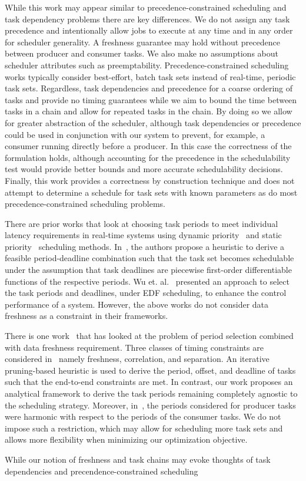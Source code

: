 While this work may appear similar to precedence-constrained scheduling and task dependency problems there are key differences. We do not assign any task precedence and intentionally allow jobs to execute at any time and in any order for scheduler generality. A freshness guarantee may hold without precedence between producer and consumer tasks. We also make no assumptions about scheduler attributes such as preemptability. Precedence-constrained scheduling works typically consider best-effort, batch task sets instead of real-time, periodic task sets. Regardless, task dependencies and precedence for a coarse ordering of tasks and provide no timing guarantees while we aim to bound the time between tasks in a chain and allow for repeated tasks in the chain. By doing so we allow for greater abstraction of the scheduler, although task dependencies or precedence could be used in conjunction with our system to prevent, for example, a consumer running directly before a producer. In this case the correctness of the formulation holds, although accounting for the precedence in the schedulability test would provide better bounds and more accurate schedulability decisions. Finally, this work provides a correctness by construction technique and does not attempt to determine a schedule for task sets with known parameters as do most precedence-constrained scheduling problems.

There are prior works that look at choosing task periods to meet individual latency requirements in real-time systems using dynamic priority~\cite{seto1996task} and static priority~\cite{SetoLehoczkySha} scheduling methods. In~\cite{ChantemWangLemmonHu}, the authors propose a heuristic to derive a feasible period-deadline combination such that the task set becomes schedulable under the assumption that task deadlines are piecewise first-order differentiable functions of the respective periods. Wu et. al.~\cite{wu2010parameter} presented an approach to select the task periods and deadlines, under EDF scheduling, to enhance the control performance of a system. However, the above works do not consider data freshness as a constraint in their frameworks.

There is one work~\cite{gerber1995guaranteeing} that has looked at the problem of period selection combined with data freshness requirement. Three classes of timing constraints are considered in~\cite{gerber1995guaranteeing} namely freshness, correlation, and separation. An iterative pruning-based heuristic is used to derive the period, offset, and deadline of tasks such that the end-to-end constraints are met. In contrast, our work proposes an analytical framework to derive the task periods remaining completely agnostic to the scheduling strategy. Moreover, in~\cite{gerber1995guaranteeing}, the periods considered for producer tasks were harmonic with respect to the periods of the consumer tasks. We do not impose such a restriction, which may allow for scheduling more task sets and allows more flexibility when minimizing our optimization objective.

While our notion of freshness and task chains may evoke thoughts of task dependencies and precendence-constrained scheduling



